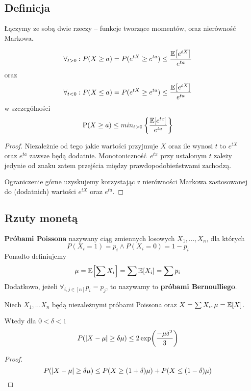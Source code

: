 \subsection{Definicja}
Łączymy ze sobą dwie rzeczy -- funkcje tworzące momentów, oraz nierówność Markowa.
\begin{theorem}
	\[
		\forall_{t > 0} : P(X \geq a) = P(e^{tX} \geq e^{ta}) \leq \frac{\expected{e^{tX}}}{e^{ta}}
	\]
	oraz
	\[
		\forall_{t < 0} : P(X \leq a) = P(e^{tX} \geq e^{ta}) \leq \frac{\expected{e^{tX}}}{e^{ta}}
	\]
    w szczególności
    \[
        \prob(X \geq a) \leq min_{t > 0}\left\{ \frac{\expected{e^{tx}}}{e^{ta}} \right\}
    \]
\end{theorem}
\begin{proof}
	Niezależnie od tego jakie wartości przyjmuje \( X \) oraz ile wynosi \( t \) to \( e^{tX} \) oraz \( e^{ta} \) zawsze będą dodatnie.
	Monotoniczność \( e^{tx} \) przy ustalonym \( t \) zależy jedynie od znaku zatem przejścia między prawdopodobieństwami zachodzą.

	Ograniczenie górne uzyskujemy korzystając z nierówności Markowa zastosowanej do (dodatnich) wartości \( e^{tX} \) oraz \( e^{ta} \).
\end{proof}

\subsection{Rzuty monetą}

\begin{definition}
	\textbf{Próbami Poissona} nazywany ciąg zmiennych losowych \( X_1, \dots, X_n \), dla których
	\[
		P(X_i = 1) = p_i \land P(X_i = 0) = 1 - p_i
	\]
	Ponadto definiujemy
	\[
		\mu = \expected{\sum X_i} = \sum \expected{X_i} = \sum p_i
	\]
    Dodatkowo, jeżeli \( \forall_{i,j \in [n]} p_i = p_j \), to nazywamy to \textbf{próbami Bernoulliego}.
\end{definition}

\begin{lemma}
	\label{independent-poisson-trials-abs-bound}
	Niech \( X_1, \dots X_n \) będą niezależnymi próbami Poissona oraz \( X = \sum X_i, \mu = \expected{X} \).

	Wtedy dla \( 0 < \delta < 1 \)
	\[
		P(\abs{X - \mu} \geq \delta \mu) \leq 2 \exp\pars{\frac{-\mu\delta^2}{3}}
	\]
\end{lemma}
\begin{proof}
	\[
		P(\abs{X - \mu} \geq \delta\mu) \leq P\pars{X \geq (1 + \delta)\mu} + P\pars{X \leq (1 - \delta)\mu}
	\]
\end{proof}

